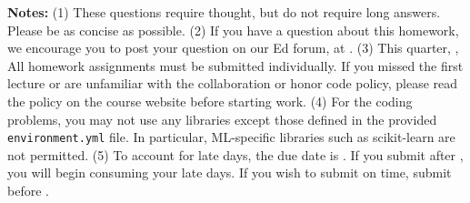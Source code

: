 {\bf Notes:} 
(1) These questions require thought, but do not require long
answers. Please be as concise as possible.  
(2) If you have a question
about this homework, we encourage you to post your question on our
Ed forum, at \piazza. 
(3) This quarter, \qtr,  All homework assignments must be submitted individually. If you
missed the first lecture or are unfamiliar with the collaboration or honor
code policy, please read the policy on the course website before starting work.
(4) For the coding problems, you may not
use any libraries except those defined in the provided \texttt{environment.yml}
file. In particular, ML-specific libraries such as scikit-learn are not
permitted. 
(5) To account for late days, the due date is \due. If you submit after
\due, you will begin consuming your
late days. If you wish to submit on time, submit before \due.

